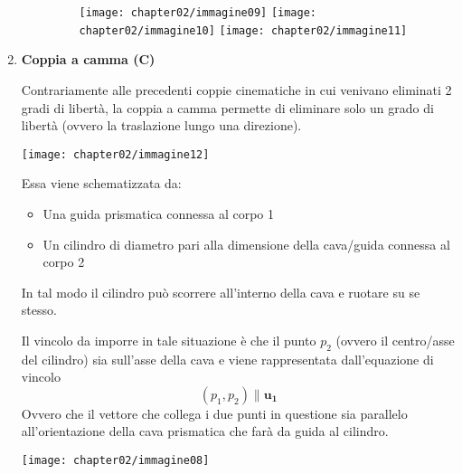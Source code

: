 \begin{enumerate}
\begin{itemize}
				\begin{figure}[h]
					\centering
					\texttt{[image: chapter02/immagine09]}
					\texttt{[image: chapter02/immagine10]}
					\texttt{[image: chapter02/immagine11]}
				\end{figure}

			\end{itemize}

			\item \textbf{Coppia a camma (C)}
	
				Contrariamente alle precedenti coppie cinematiche in cui venivano eliminati 2 gradi di libertà, la coppia a camma permette di eliminare solo un grado di libertà (ovvero la traslazione lungo una direzione). 

				\begin{minipage}{.25\textwidth}
					\centering
					\texttt{[image: chapter02/immagine12]}
				\end{minipage}
				\hfill	
				\begin{minipage}{.7\textwidth}
					Essa viene schematizzata da:
	\begin{itemize}
	\item Una guida prismatica connessa al corpo 1 
	\item Un cilindro di diametro pari alla dimensione della cava/guida connessa al corpo 2
\end{itemize}
\end{minipage}
\vspace{2mm}

	In tal modo il cilindro può scorrere all'interno della cava e ruotare su se stesso.

\begin{minipage}{.45\textwidth}
Il vincolo da imporre in tale situazione è che il punto $p_2$ (ovvero il centro/asse del cilindro) sia sull'asse della cava e viene rappresentata dall'equazione di vincolo  \[(p_1,p_2) \parallel \mathbf{u_1}\]
Ovvero che il vettore che collega i due punti in questione sia parallelo all'orientazione della cava prismatica che farà da guida al cilindro.
\end{minipage}
\hfill
\begin{minipage}{.45\textwidth}
\centering
\texttt{[image: chapter02/immagine08]}
\end{minipage}
\end{enumerate}


